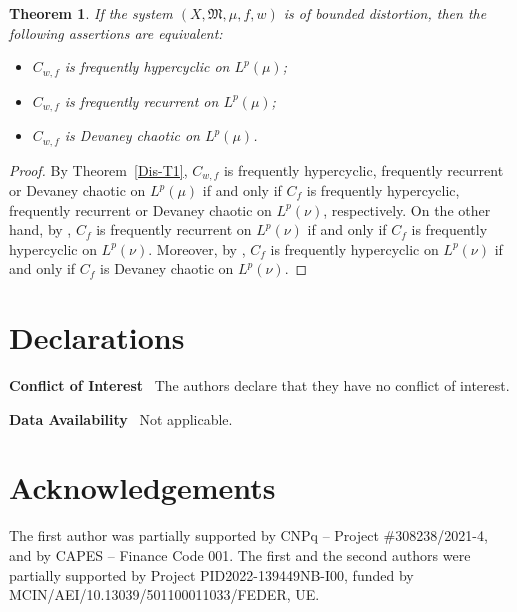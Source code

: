 \documentclass[12pt]{article}
\theoremstyle{plain}
\newtheorem{theorem}{Theorem}%
\theoremstyle{definition}
\newcommand{\fM}{\mathfrak{M}}
\begin{document}
\begin{theorem}
If the system $(X,\fM,\mu,f,w)$ is of bounded distortion, then the following assertions are equivalent:
\begin{itemize}
\item [\rm (i)] $C_{w,f}$ is frequently  hypercyclic on $L^p(\mu)$;
\item [\rm (ii)] $C_{w,f}$ is frequently recurrent on $L^p(\mu)$;
\item [\rm (iii)] $C_{w,f}$ is Devaney chaotic on $L^p(\mu)$.
\end{itemize}

\end{theorem}
\begin{proof}

By Theorem~\ref{Dis-T1}, $C_{w,f}$ is frequently hypercyclic, frequently recurrent or Devaney chaotic on $L^p(\mu)$ 
if and only if $C_{f}$ is frequently hypercyclic, frequently recurrent or Devaney chaotic on $L^p(\nu)$, respectively.
On the other hand,  by \cite[Theorem~2.9]{AniMaiSeo24}, $C_{f}$ is frequently recurrent on $L^p(\nu)$ 
if and only if $C_{f}$ is frequently hypercyclic on $L^p(\nu)$.
Moreover,  by \cite[Theorem 3.7]{UDarBPir21}, $C_{f}$ is frequently hypercyclic on $L^p(\nu)$ 
if and only if $C_{f}$ is Devaney chaotic on $L^p(\nu)$.
\end{proof}


\section*{Declarations}

\noindent
{\bf Conflict of Interest} \ The authors declare that they have no conflict of interest.

\medskip\noindent
{\bf Data Availability} \ Not applicable.


\section*{Acknowledgements}

The first author was partially supported by CNPq -- Project {\#}308238/2021-4, and by CAPES -- Finance Code 001.
The first and the second authors were partially supported by Project PID2022-139449NB-I00, 
funded by MCIN/AEI/10.13039/501100011033/FEDER, UE.
\end{document}
